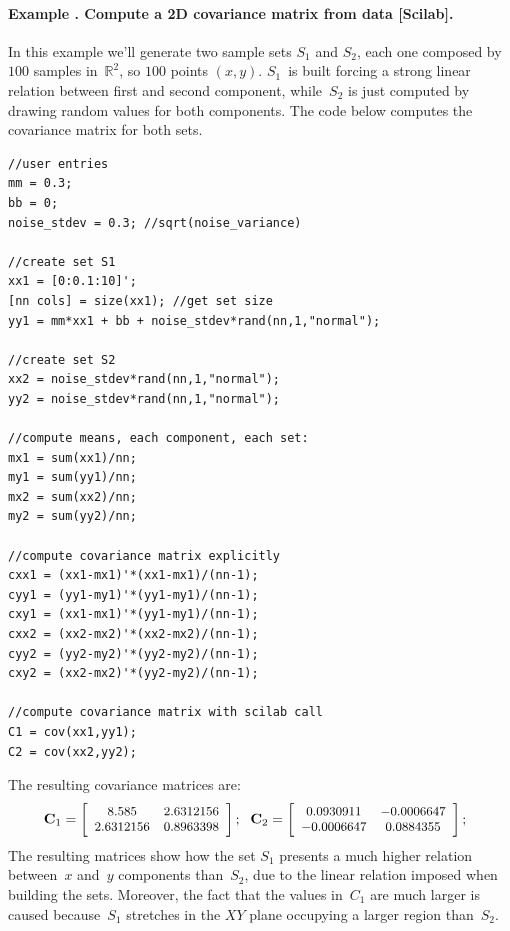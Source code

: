 \paragraph{Example \theexamplecounter. Compute a 2D covariance matrix from data [Scilab].}
In this example we'll generate two sample sets $S_1$ and $S_2$, each one composed by $100$ samples in~$\mathbb{R}^2$, so $100$ points $(x,y)$. $S_1$~is built forcing a strong linear relation between first and second component, while~$S_2$ is just computed by drawing random values for both components. The code below computes the covariance matrix for both sets.
\begin{mdframed}
\tiny
\begin{verbatim} 
//user entries
mm = 0.3;
bb = 0;
noise_stdev = 0.3; //sqrt(noise_variance)

//create set S1
xx1 = [0:0.1:10]';
[nn cols] = size(xx1); //get set size
yy1 = mm*xx1 + bb + noise_stdev*rand(nn,1,"normal");

//create set S2
xx2 = noise_stdev*rand(nn,1,"normal");
yy2 = noise_stdev*rand(nn,1,"normal");

//compute means, each component, each set:
mx1 = sum(xx1)/nn;
my1 = sum(yy1)/nn;
mx2 = sum(xx2)/nn;
my2 = sum(yy2)/nn;

//compute covariance matrix explicitly
cxx1 = (xx1-mx1)'*(xx1-mx1)/(nn-1);
cyy1 = (yy1-my1)'*(yy1-my1)/(nn-1);
cxy1 = (xx1-mx1)'*(yy1-my1)/(nn-1);
cxx2 = (xx2-mx2)'*(xx2-mx2)/(nn-1);
cyy2 = (yy2-my2)'*(yy2-my2)/(nn-1);
cxy2 = (xx2-mx2)'*(yy2-my2)/(nn-1);

//compute covariance matrix with scilab call
C1 = cov(xx1,yy1);
C2 = cov(xx2,yy2);
\end{verbatim} 
\end{mdframed}
The resulting covariance matrices are:
\begin{equation}
\small
\mathbf{C}_1 = 
\left[
 \begin{array}{cc}
    8.585      &  2.6312156  \\
    2.6312156  &  0.8963398  \\
 \end{array}
 \right];\ \ 
\mathbf{C}_2 = 
\left[
 \begin{array}{cc}
    0.0930911  & - 0.0006647  \\
  - 0.0006647  &  0.0884355   \\
 \end{array}
 \right];\ \ 
\end{equation}
The resulting matrices show how the set $S_1$ presents a much higher relation between~$x$ and~$y$ components than~$S_2$, due to the linear relation imposed when building the sets. Moreover, the fact that the values in~$C_1$ are much larger is caused because~$S_1$ stretches in the $XY$ plane occupying a larger region than~$S_2$.

